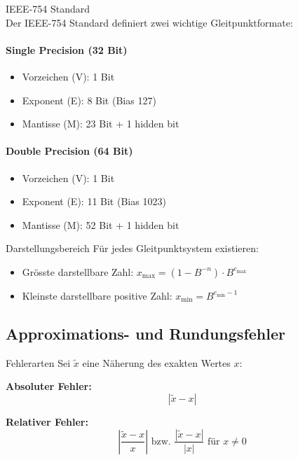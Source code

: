 \begin{concept}{IEEE-754 Standard}\\
Der IEEE-754 Standard definiert zwei wichtige Gleitpunktformate:
\paragraph{Single Precision (32 Bit)}
\begin{itemize}
    \item Vorzeichen (V): 1 Bit
    \item Exponent (E): 8 Bit (Bias 127)
    \item Mantisse (M): 23 Bit + 1 hidden bit
\end{itemize}
\paragraph{Double Precision (64 Bit)}
\begin{itemize}
    \item Vorzeichen (V): 1 Bit
    \item Exponent (E): 11 Bit (Bias 1023)
    \item Mantisse (M): 52 Bit + 1 hidden bit
\end{itemize}
\end{concept}

\begin{theorem}{Darstellungsbereich}
Für jedes Gleitpunktsystem existieren:
\begin{itemize}
    \item Grösste darstellbare Zahl: \large{$x_{\text{max}} = (1-B^{-n}) \cdot B^{e_{\text{max}}}$}
    \item \normalsize{Kleinste darstellbare positive Zahl:} \large{$x_{\text{min}} = B^{e_{\text{min}}-1}$}
\end{itemize}
\end{theorem}

\subsection{Approximations- und Rundungsfehler}

\begin{definition}{Fehlerarten}
Sei $\tilde{x}$ eine Näherung des exakten Wertes $x$:
\vspace{1mm}\\
\begin{minipage}[t]{0.35\textwidth}
    \textbf{Absoluter Fehler:}  $$\left|\tilde{x}-x\right|$$
\end{minipage}
\hspace{3mm}
\begin{minipage}[t]{0.5\textwidth}
    \textbf{Relativer Fehler:}  $$\left|\frac{\tilde{x}-x}{x}\right| \text{ bzw. } \frac{|\tilde{x}-x|}{|x|} \text{ für } x \neq 0$$
\end{minipage}
\end{definition}

